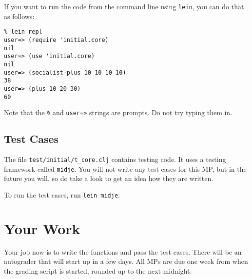 \documentclass[12pt]{article}
\begin{document}
If you want to run the code from the command line using \texttt{lein}, you can
do that as follows:

\begin{verbatim}
% lein repl
user=> (require 'initial.core)
nil
user=> (use 'initial.core)
nil
user=> (socialist-plus 10 10 10 10)
38
user=> (plus 10 20 30)
60
\end{verbatim}

Note that the \verb|%| and \verb|user=>| strings are prompts.
Do not try typing them in.

\subsection{Test Cases}

The file \texttt{test/initial/t\_core.clj} contains testing code.
It uses a testing framework called \texttt{midje}.  You will not
write any test cases for this MP, but in the future you will, so
do take a look to get an idea how they are written.

To run the test cases, run \texttt{lein midje}.

\section{Your Work}

Your job now is to write the functions and pass the test cases.
There will be an autograder that will start up in a few days.
All MPs are due one week from when the grading script is started,
rounded up to the next midnight.
\end{document}

